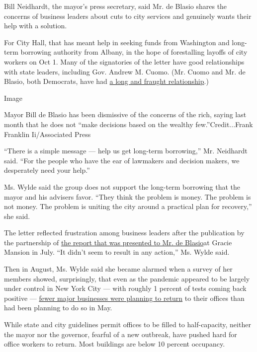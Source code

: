 Bill Neidhardt, the mayor's press secretary, said Mr. de Blasio shares
the concerns of business leaders about cuts to city services and
genuinely wants their help with a solution.

For City Hall, that has meant help in seeking funds from Washington and
long-term borrowing authority from Albany, in the hope of forestalling
layoffs of city workers on Oct 1. Many of the signatories of the letter
have good relationships with state leaders, including Gov. Andrew M.
Cuomo. (Mr. Cuomo and Mr. de Blasio, both Democrats, have had
\href{https://www.nytimes3xbfgragh.onion/2018/04/22/nyregion/cuomo-deblasio-feud-nyc.html}{a
long and fraught relationship}.)

Image

Mayor Bill de Blasio has been dismissive of the concerns of the rich,
saying last month that he does not ``make decisions based on the wealthy
few.''Credit...Frank Franklin Ii/Associated Press

``There is a simple message --- help us get long-term borrowing,'' Mr.
Neidhardt said. ``For the people who have the ear of lawmakers and
decision makers, we desperately need your help.''

Ms. Wylde said the group does not support the long-term borrowing that
the mayor and his advisers favor. ``They think the problem is money. The
problem is not money. The problem is uniting the city around a practical
plan for recovery,'' she said.

The letter reflected frustration among business leaders after the
publication by the partnership of
\href{https://pfnyc.org/wp-content/uploads/2020/07/actionandcollaboration.pdf}{the
report that was presented to Mr. de Blasio}at Gracie Mansion in July.
``It didn't seem to result in any action,'' Ms. Wylde said.

Then in August, Ms. Wylde said she became alarmed when a survey of her
members showed, surprisingly, that even as the pandemic appeared to be
largely under control in New York City --- with roughly 1 percent of
tests coming back positive ---
\href{https://pfnyc.org/news/return-to-office-survey-released-from-partnership-for-new-york-city/}{fewer
major businesses were planning to return} to their offices than had been
planning to do so in May.

While state and city guidelines permit offices to be filled to
half-capacity, neither the mayor nor the governor, fearful of a new
outbreak, have pushed hard for office workers to return. Most buildings
are below 10 percent occupancy.

